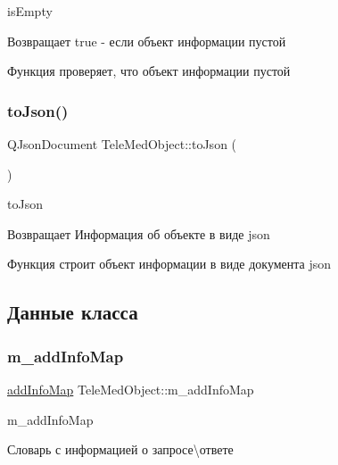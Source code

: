 is\+Empty 

\begin{DoxyReturn}{Возвращает}
true -\/ если объект информации пустой
\end{DoxyReturn}
Функция проверяет, что объект информации пустой \mbox{\label{classTeleMedObject_a37d8e7cede94ef1695171d35c6c0c1ce}} 
\subsubsection{\texorpdfstring{to\+Json()}{toJson()}}
{\footnotesize\ttfamily Q\+Json\+Document Tele\+Med\+Object\+::to\+Json (\begin{DoxyParamCaption}{ }\end{DoxyParamCaption})}



to\+Json 

\begin{DoxyReturn}{Возвращает}
Информация об объекте в виде json
\end{DoxyReturn}
Функция строит объект информации в виде документа json 

\subsection{Данные класса}
\mbox{\label{classTeleMedObject_a812a8fdb794711a94a9fc0fa4f1de27e}} 
\subsubsection{\texorpdfstring{m\+\_\+add\+Info\+Map}{m\_addInfoMap}}
{\footnotesize\ttfamily \hyperlink{dbform_8h_a1ec1a645f41e1c6544d384ca863a936c}{add\+Info\+Map} Tele\+Med\+Object\+::m\+\_\+add\+Info\+Map\hspace{0.3cm}{\ttfamily [private]}}



m\+\_\+add\+Info\+Map 

Словарь с информацией о запросе\textbackslash{}ответе \mbox{\label{classTeleMedObject_a15a8c04c55623d826a04908a949fce31}} 
